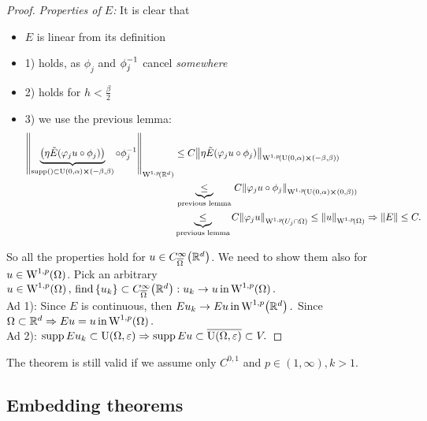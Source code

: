 \documentclass{article}
\begin{document}
\begin{proof}
	\textit{Properties of $E$:}
	It is clear that
	\begin{itemize}
		\item $E$ is linear from its definition
		\item 1) holds, as $\phi_j$ and $\phi_j^{-1}$ cancel \textit{somewhere}
		\item 2) holds for $h<\frac{\beta}{2}$ 
		\item 3) we use the previous lemma:
			\begin{align*}
				\norm{\underbrace{\qty(\eta \tilde{E}\qty(\varphi_j u \circ \phi_j))}_{\supp () \subset \text{U}(0,\alpha) \cross (-\beta, \beta)} \circ \inverse{\phi_j}}_{\WkpSet[1][p]{\R^d}} & \leq C \norm{\eta \tilde{E}\qty(\varphi_j u \circ \phi_j)}_{\WkpSet[1][p]{\text{U}(0,\alpha) \cross (-\beta, \beta)}} \\ &\underbrace{\leq}_{\, \text{previous lemma} \,} C \norm{\varphi_j u \circ \phi_j}_{\WkpSet[1][p]{\text{U}(0,\alpha) \cross (0,\beta)}}\\ &\underbrace{\leq}_{\text{previous lemma}} C \norm{\varphi_j u}_{\WkpSet[1][p]{U_j \cap \Omega}} \leq \norm{u}_{\WkpSet[1][p]{\Omega}} \Rightarrow \norm{E} \leq C.
			\end{align*}
	\end{itemize}
	So all the properties hold for $u \in C^{\infty}_{\overline{\Omega}}\qty({\mathbb R}^d)$. We need to show them also for $u \in \WkpSet[1][p]{\Omega}$. Pick an arbitrary $u \in \WkpSet[1][p]{\Omega}, \, \text{find} \, \{u_k\} \subset C^{\infty}_{\overline{\Omega}}\qty(\R^d): u_k \to u \, \text{in} \, \WkpSet[1][p]{\Omega}.$ \\
	Ad 1): Since $E$ is continuous, then $E u_k \to Eu \, \text{in} \, \WkpSet[1][p]{\R^d}.$ Since $\Omega \subset \R^d \Rightarrow Eu=u \, \text{in} \, \WkpSet[1][p]{\Omega}.$ \\
	Ad 2): $\operatorname{supp} Eu_k \subset \text{U}(\Omega,\varepsilon) \Rightarrow \operatorname{supp} Eu \subset \overline{\text{U}(\Omega,\varepsilon)} \subset V.$

\end{proof}

\begin{remark}
	The theorem is still valid if we assume only $C^{0,1}$ and $p \in (1,\infty), k>1.$
\end{remark}

\subsection{Embedding theorems}
\label{sec:embedding}
\end{document}
